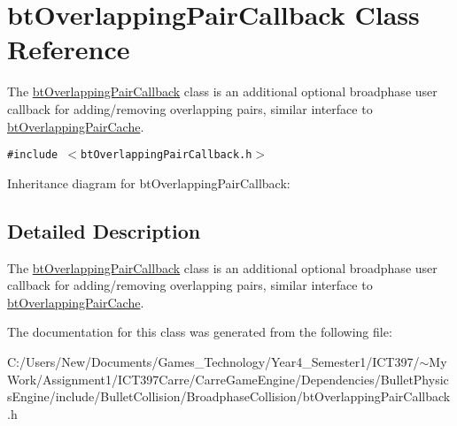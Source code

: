 \hypertarget{classbt_overlapping_pair_callback}{
\section{btOverlappingPairCallback Class Reference}
\label{classbt_overlapping_pair_callback}
}
The \hyperlink{classbt_overlapping_pair_callback}{btOverlappingPairCallback} class is an additional optional broadphase user callback for adding/removing overlapping pairs, similar interface to \hyperlink{classbt_overlapping_pair_cache}{btOverlappingPairCache}.  


{\tt \#include $<$btOverlappingPairCallback.h$>$}

Inheritance diagram for btOverlappingPairCallback:

\subsection{Detailed Description}
The \hyperlink{classbt_overlapping_pair_callback}{btOverlappingPairCallback} class is an additional optional broadphase user callback for adding/removing overlapping pairs, similar interface to \hyperlink{classbt_overlapping_pair_cache}{btOverlappingPairCache}. 

The documentation for this class was generated from the following file:\begin{CompactItemize}
\item 
C:/Users/New/Documents/Games\_\-Technology/Year4\_\-Semester1/ICT397/$\sim$My Work/Assignment1/ICT397Carre/CarreGameEngine/Dependencies/BulletPhysicsEngine/include/BulletCollision/BroadphaseCollision/btOverlappingPairCallback.h\end{CompactItemize}
